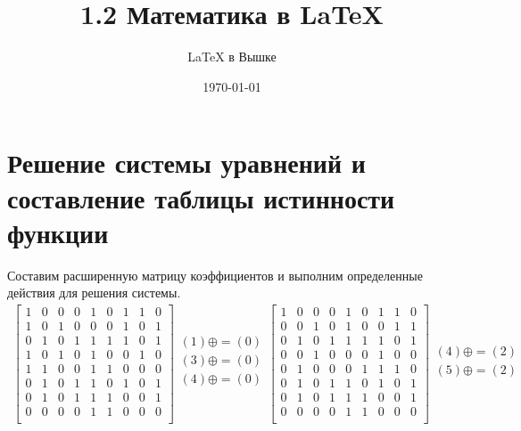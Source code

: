 \documentclass[a4paper,10pt]{article} %
\author{\LaTeX{} в Вышке}
\title{1.2 Математика в \LaTeX}
\date{\today}
\begin{document}
	\maketitle
	
	\section{Решение системы уравнений и составление таблицы истинности функции}
	
	Составим расширенную матрицу коэффициентов и выполним определенные действия для решения системы.
	\begin{multline}
		\begin{bmatrix}
		1 & 0 & 0 & 0 & 1 & 0 & 1 & 1 & 0 \\
		1 & 0 & 1 & 0 & 0 & 0 & 1 & 0 & 1 \\
		0 & 1 & 0 & 1 & 1 & 1 & 1 & 0 & 1 \\
		1 & 0 & 1 & 0 & 1 & 0 & 0 & 1 & 0 \\
		1 & 1 & 0 & 0 & 1 & 1 & 0 & 0 & 0 \\
		0 & 1 & 0 & 1 & 1 & 0 & 1 & 0 & 1 \\
		0 & 1 & 0 & 1 & 1 & 1 & 0 & 0 & 1 \\
		0 & 0 & 0 & 0 & 1 & 1 & 0 & 0 & 0 \\
		\end{bmatrix}
		\begin{align}
		(1) \oplus= (0)\\
		(3) \oplus= (0)\\
		(4) \oplus= (0)\\
		\end{align}
		\begin{bmatrix}
		1 & 0 & 0 & 0 & 1 & 0 & 1 & 1 & 0 \\
		0 & 0 & 1 & 0 & 1 & 0 & 0 & 1 & 1 \\
		0 & 1 & 0 & 1 & 1 & 1 & 1 & 0 & 1 \\
		0 & 0 & 1 & 0 & 0 & 0 & 1 & 0 & 0 \\
		0 & 1 & 0 & 0 & 0 & 1 & 1 & 1 & 0 \\
		0 & 1 & 0 & 1 & 1 & 0 & 1 & 0 & 1 \\
		0 & 1 & 0 & 1 & 1 & 1 & 0 & 0 & 1 \\
		0 & 0 & 0 & 0 & 1 & 1 & 0 & 0 & 0 \\
		\end{bmatrix}
		\begin{align}
		(4) \oplus= (2)\\
		(5) \oplus= (2)\\

\end{align}
\end{multline}
\end{document}
